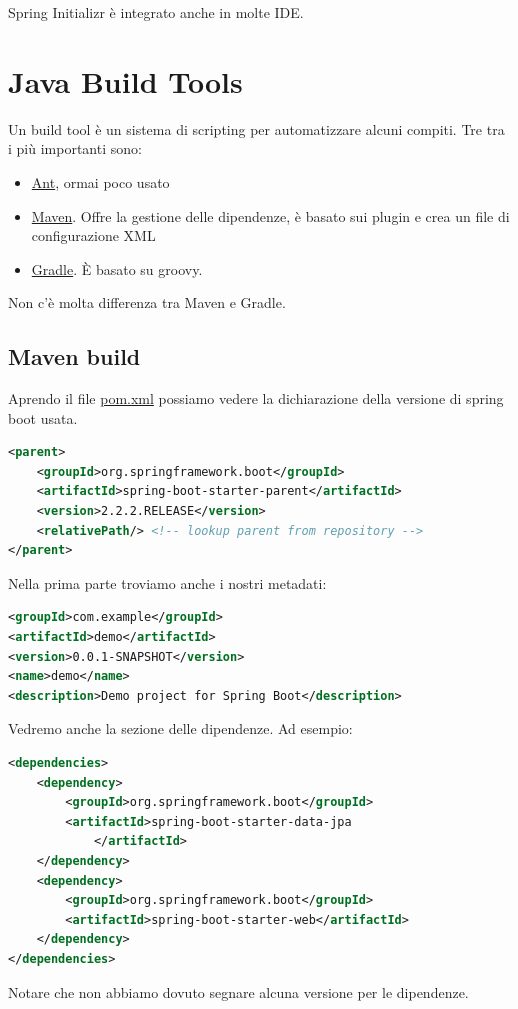 \documentclass[11pt,a4paper]{book}
\begin{document}
Spring Initializr è integrato anche in molte IDE.

\section{Java Build Tools}
Un build tool è un sistema di scripting per automatizzare alcuni compiti. Tre tra i più importanti sono:
\begin{itemize}
	\item \href{https://ant.apache.org/}{Ant}, ormai poco usato
	\item \href{https://maven.apache.org/}{Maven}. Offre la gestione delle dipendenze, è basato sui plugin e crea un file di configurazione XML
	\item \href{https://gradle.org/}{Gradle}. È basato su groovy.
\end{itemize}
Non c'è molta differenza tra Maven e Gradle.

\subsection{Maven build}
Aprendo il file \href{Codici/SpringInitializr/Maven/pom.xml}{pom.xml} possiamo vedere la dichiarazione della versione di spring boot usata.
\begin{lstlisting}[language = XML]
<parent>
	<groupId>org.springframework.boot</groupId>
	<artifactId>spring-boot-starter-parent</artifactId>
	<version>2.2.2.RELEASE</version>
	<relativePath/> <!-- lookup parent from repository -->
</parent>
\end{lstlisting}

Nella prima parte troviamo anche i nostri metadati:
\begin{lstlisting}[language = XML]
<groupId>com.example</groupId>
<artifactId>demo</artifactId>
<version>0.0.1-SNAPSHOT</version>
<name>demo</name>
<description>Demo project for Spring Boot</description>
\end{lstlisting}

Vedremo anche la sezione delle dipendenze. Ad esempio:
\begin{lstlisting}[language = XML]
<dependencies>
	<dependency>
		<groupId>org.springframework.boot</groupId>
		<artifactId>spring-boot-starter-data-jpa
			</artifactId>
	</dependency>
	<dependency>
		<groupId>org.springframework.boot</groupId>
		<artifactId>spring-boot-starter-web</artifactId>
	</dependency>
</dependencies>
\end{lstlisting}
Notare che non abbiamo dovuto segnare alcuna versione per le dipendenze.
\end{document}
